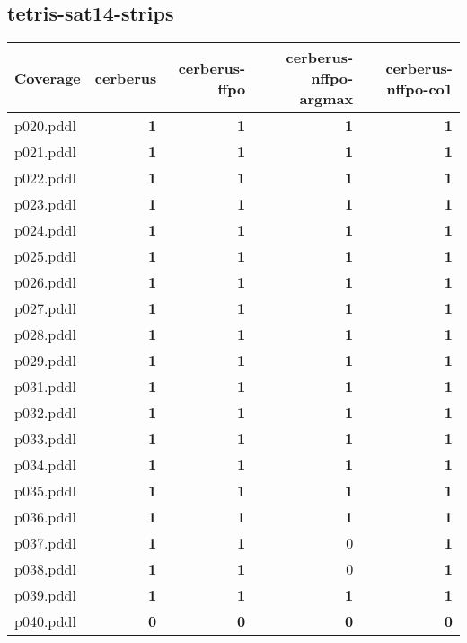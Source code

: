 \documentclass{article}
\begin{document}
\hypertarget{coverage-tetris-sat14-strips}{}
\subsection*{tetris-sat14-strips}

\begin{tabular}{@{}lrrrr@{}}
Coverage & cerberus & cerberus-ffpo & cerberus-nffpo-argmax & cerberus-nffpo-co1 \\
\midrule
p020.pddl & \textbf{1} & \textbf{1} & \textbf{1} & \textbf{1} \\
p021.pddl & \textbf{1} & \textbf{1} & \textbf{1} & \textbf{1} \\
p022.pddl & \textbf{1} & \textbf{1} & \textbf{1} & \textbf{1} \\
p023.pddl & \textbf{1} & \textbf{1} & \textbf{1} & \textbf{1} \\
p024.pddl & \textbf{1} & \textbf{1} & \textbf{1} & \textbf{1} \\
p025.pddl & \textbf{1} & \textbf{1} & \textbf{1} & \textbf{1} \\
p026.pddl & \textbf{1} & \textbf{1} & \textbf{1} & \textbf{1} \\
p027.pddl & \textbf{1} & \textbf{1} & \textbf{1} & \textbf{1} \\
p028.pddl & \textbf{1} & \textbf{1} & \textbf{1} & \textbf{1} \\
p029.pddl & \textbf{1} & \textbf{1} & \textbf{1} & \textbf{1} \\
p031.pddl & \textbf{1} & \textbf{1} & \textbf{1} & \textbf{1} \\
p032.pddl & \textbf{1} & \textbf{1} & \textbf{1} & \textbf{1} \\
p033.pddl & \textbf{1} & \textbf{1} & \textbf{1} & \textbf{1} \\
p034.pddl & \textbf{1} & \textbf{1} & \textbf{1} & \textbf{1} \\
p035.pddl & \textbf{1} & \textbf{1} & \textbf{1} & \textbf{1} \\
p036.pddl & \textbf{1} & \textbf{1} & \textbf{1} & \textbf{1} \\
p037.pddl & \textbf{1} & \textbf{1} & 0 & \textbf{1} \\
p038.pddl & \textbf{1} & \textbf{1} & 0 & \textbf{1} \\
p039.pddl & \textbf{1} & \textbf{1} & \textbf{1} & \textbf{1} \\
p040.pddl & \textbf{0} & \textbf{0} & \textbf{0} & \textbf{0} \\
\end{tabular}
\end{document}
